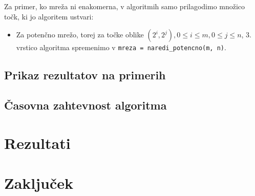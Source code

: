 \documentclass[a4paper]{article}
\begin{document}
Za primer, ko mreža ni enakomerna, v algoritmih samo prilagodimo množico točk, ki jo algoritem ustvari:
\begin{itemize}
    \item {Za potenčno mrežo, torej za točke oblike $(2^i, 2^j), 0 \leq i \leq m, 0 \leq j \leq n$, 3. vrstico algoritma spremenimo v \lstinline{mreza = naredi_potencno(m, n)}.}
\end{itemize}
\subsection{Prikaz rezultatov na primerih}

\subsection{Časovna zahtevnost algoritma}

\section{Rezultati}

\section{Zaključek}
\end{document}
